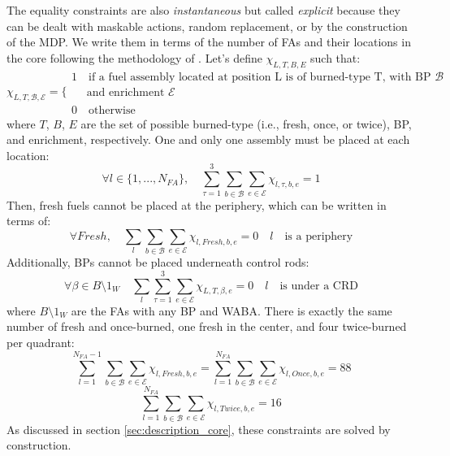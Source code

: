 \documentclass[a4paper]{article}
\begin{document}
The equality constraints are also \textit{instantaneous} but called \textit{explicit} \cite{liu2021policy} because they can be dealt with maskable actions, random replacement, or by the construction of the MDP. We write them in terms of the number of FAs and their locations in the core following the methodology of \cite{kropaczek1991incore}. Let's define $\chi_{L,T,B,E}$ such that:
\[\chi_{L,T,\mathcal{B},\mathcal{E}} = \{\begin{array}{l}
     1 \quad \text{if a fuel assembly located at position L is of burned-type T, with BP } \mathcal{B}  \\
      \quad \text{   and enrichment } \mathcal{E}  \\
     \\
    0 \quad  \text{otherwise} 
\end{array}\]
where $T$, $B$, $E$ are the set of possible burned-type (i.e., fresh, once, or twice), BP, and enrichment, respectively. One and only one assembly must be placed at each location:
\begin{equation}
\forall l \in \{1,...,N_{FA}\}, \quad \sum_{\tau = 1}^3 \sum_{b \in \mathcal{B}} \sum_{e \in \mathcal{E}} \chi_{l,\tau,b,e} = 1
\end{equation}
Then, fresh fuels cannot be placed at the periphery, which can be written in terms of:
\begin{equation}\forall Fresh, \quad \sum_{l} \sum_{b \in \mathcal{B}} \sum_{e 
\in \mathcal{E}} \chi_{l,Fresh,b,e} = 0 \quad l \quad \text{is a periphery}\end{equation}
Additionally, BPs cannot be placed underneath control rods:
\begin{equation}\forall \beta \in B \setminus 1_W \quad \sum_{l} \sum_{\tau = 1}^3 \sum_{e 
\in \mathcal{E}} \chi_{L,T,\beta,e} = 0 \quad l \quad \text{is under a CRD}\end{equation}
where $B \setminus 1_W$ are the FAs with any BP and WABA. There is exactly the same number of fresh and once-burned, one fresh in the center, and four twice-burned per quadrant:
\begin{equation}\sum_{l = 1}^{N_{FA} - 1}  \sum_{b \in \mathcal{B}} \sum_{e 
\in \mathcal{E}} \chi_{l,Fresh,b,e} = \sum_{l = 1}^{N_{FA}}  \sum_{b \in \mathcal{B}} \sum_{e 
\in \mathcal{E}} \chi_{l,Once,b,e} = 88\end{equation}
\begin{equation}\sum_{l = 1}^{N_{FA}} \sum_{b \in \mathcal{B}} \sum_{e 
\in \mathcal{E}} \chi_{l,Twice,b,e} = 16\end{equation}
As discussed in section \ref{sec:description_core}, these constraints are solved by construction.
\end{document}
